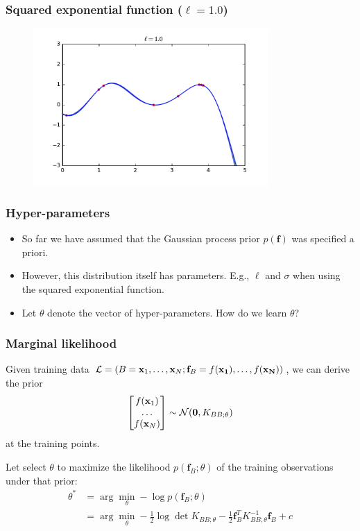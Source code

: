 \documentclass{beamer}
\begin{document}
\begin{frame}
    \frametitle{Squared exponential function ($\ell=1.0$)}

    \begin{figure}
        \centering
        \includegraphics[width=0.8\textwidth]{./figures/rbf-10.pdf}
    \end{figure}
\end{frame}


\begin{frame}
    \frametitle{Hyper-parameters}

    \begin{itemize}
        \item So far we have assumed that the Gaussian process prior $p(\mathbf{f})$
        was specified a priori.

        \item However, this distribution itself has  parameters. E.g., $\ell$ and $\sigma$ when
        using the squared exponential function.

        \item Let $\theta$ denote the vector of hyper-parameters. How do we learn $\theta$?
    \end{itemize}
\end{frame}


\begin{frame}
    \frametitle{Marginal likelihood}

    Given training data ${\cal L} = (B = \mathbf{x}_1, \dots, \mathbf{x}_N; \mathbf{f}_B = f(\mathbf{x_1}), \dots, f(\mathbf{x_N} ))$,
    we can derive the prior
        $$\begin{bmatrix} f(\mathbf{x}_1)\\
                          \dots \\
                          f(\mathbf{x}_N) \end{bmatrix} \sim {\cal N}(\mathbf{0}, K_{BB;\theta})$$
    at the training points.

    Let select $\theta$ to maximize the likelihood $p(\mathbf{f}_B;\theta)$ of the training observations under that prior:
    \begin{align*}
        \theta^* &= \arg \min_\theta - \log p(\mathbf{f}_B;\theta) \\
                 &= \arg \min_\theta - \frac{1}{2} \log \det K_{BB;\theta} - \frac{1}{2} \mathbf{f}_B^T K_{BB;\theta}^{-1} \mathbf{f}_B + c
    \end{align*}

\end{frame}
\end{document}
